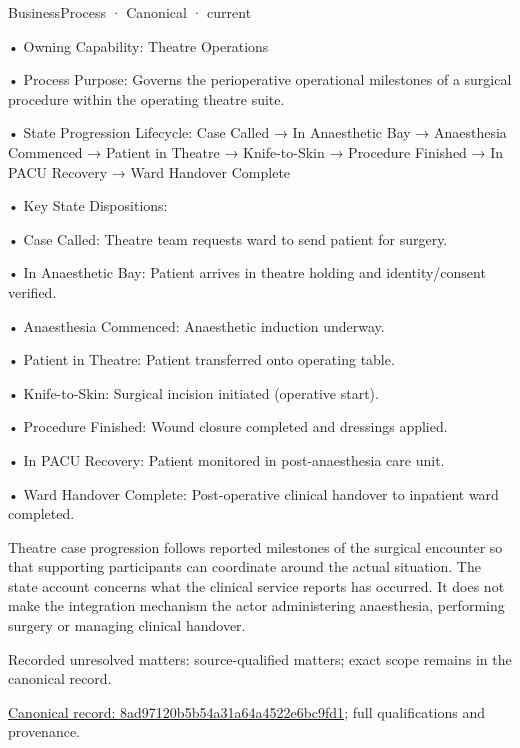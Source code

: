 \label{element:8ad97120b5b54a31a64a4522e6bc9fd1}
{\small BusinessProcess · Canonical · current}\par

•
Owning Capability: Theatre Operations



•
Process Purpose: Governs the perioperative operational milestones of a surgical procedure within the operating theatre suite.



•
State Progression Lifecycle: Case Called → In Anaesthetic Bay → Anaesthesia Commenced → Patient in Theatre → Knife-to-Skin → Procedure Finished → In PACU Recovery → Ward Handover Complete



•
Key State Dispositions:



•
Case Called: Theatre team requests ward to send patient for surgery.



•
In Anaesthetic Bay: Patient arrives in theatre holding and identity/consent verified.



•
Anaesthesia Commenced: Anaesthetic induction underway.



•
Patient in Theatre: Patient transferred onto operating table.



•
Knife-to-Skin: Surgical incision initiated (operative start).



•
Procedure Finished: Wound closure completed and dressings applied.



•
In PACU Recovery: Patient monitored in post-anaesthesia care unit.



•
Ward Handover Complete: Post-operative clinical handover to inpatient ward completed.



Theatre case progression follows reported milestones of the surgical encounter so that supporting participants can coordinate around the actual situation. The state account concerns what the clinical service reports has occurred. It does not make the integration mechanism the actor administering anaesthesia, performing surgery or managing clinical handover.


{\small Recorded unresolved matters: source-qualified matters; exact scope remains in the canonical record.}\par
{\footnotesize \href{../../../../continuum/business/business-process/8ad97120b5b54a31a64a4522e6bc9fd1.md}{Canonical record: 8ad97120b5b54a31a64a4522e6bc9fd1}; full qualifications and provenance.}\par
